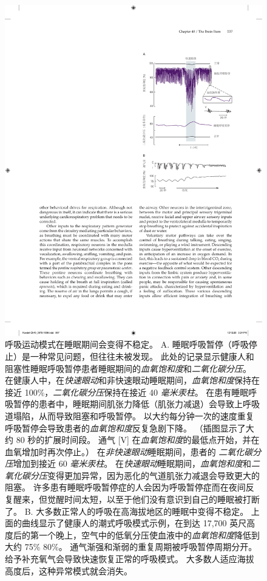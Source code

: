 \begin{figure}[htbp]
	\centering
	\includegraphics[width=0.72\linewidth]{chap40/fig_40_10}
	\caption{呼吸运动模式在睡眠期间会变得不稳定。
		A. 睡眠呼吸暂停（呼吸停止）是一种常见问题，但往往未被发现。
		此处的记录显示健康人和阻塞性睡眠呼吸暂停患者睡眠期间的\textit{血氧饱和度}和\textit{二氧化碳分压}。
		在健康人中，在\textit{快速眼动}和非快速眼动睡眠期间，\textit{血氧饱和度}保持在接近 100\%，\textit{二氧化碳分压}保持在接近 40 \textit{毫米汞柱}。
		在患有睡眠呼吸暂停的患者中，睡眠期间肌张力降低（肌张力减退）会导致上呼吸道塌陷，从而导致阻塞和呼吸暂停。
		以大约每分钟一次的速度重复呼吸暂停会导致患者的\textit{血氧饱和度}反复急剧下降。
		（插图显示了大约 80 秒的扩展时间段。
		通气 [V] 在\textit{血氧饱和度}的最低点开始，并在血氧增加时再次停止。）
		在\textit{非快速眼动}睡眠期间，患者的 \textit{二氧化碳分压}增加到接近 60 \textit{毫米汞柱}。 
		在\textit{快速眼动}睡眠期间，\textit{血氧饱和度}和\textit{二氧化碳分压}变得更加异常，因为恶化的气道肌张力减退会导致更大的阻塞。
		许多患有睡眠呼吸暂停症的人会因为呼吸暂停症而在夜间反复醒来，但觉醒时间太短，以至于他们没有意识到自己的睡眠被打断了\cite{grunstein1990neural}。 
		B. 大多数正常人的呼吸在高海拔地区的睡眠中变得不稳定。
		上面的曲线显示了健康人的潮式呼吸模式示例，在到达 17,700 英尺高度后的第一个晚上，空气中的低氧分压使血液中的\textit{血氧饱和度}降低到大约 75\% 80\%。
		通气渐强和渐弱的重复周期被呼吸暂停周期分开。
		给予补充氧气会导致快速恢复正常的呼吸模式。
		大多数人适应海拔高度后，这种异常模式就会消失\cite{lahiri1984sleep}。}
	\label{fig:40_10}
\end{figure}


